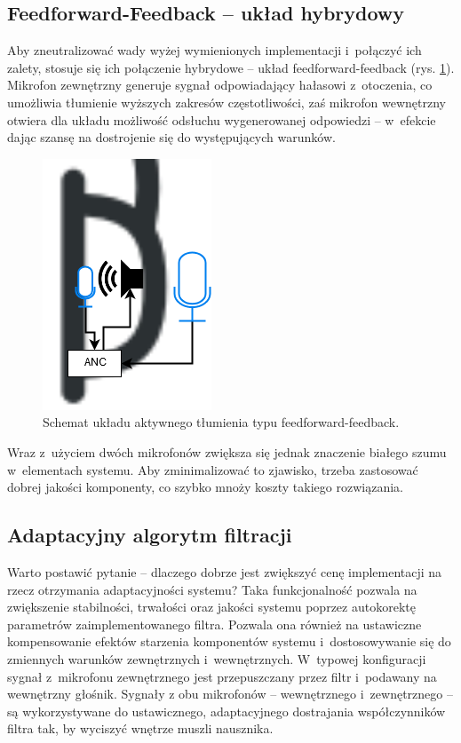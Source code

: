 \subsection{Feedforward-Feedback -- układ hybrydowy}
\label{hybrid}
Aby zneutralizować wady wyżej wymienionych implementacji i~połączyć ich zalety, stosuje się ich połączenie hybrydowe -- układ feedforward-feedback (rys. \ref{fig:feedforward_feedback}). Mikrofon zewnętrzny generuje sygnał odpowiadający hałasowi z~otoczenia, co umożliwia tłumienie wyższych zakresów częstotliwości, zaś mikrofon wewnętrzny otwiera dla układu możliwość odsłuchu wygenerowanej odpowiedzi -- w~efekcie dając szansę na dostrojenie się do występujących warunków. 
\begin{figure}[h!]
	\centering
	\includegraphics[scale=0.7]{../Assets/feedforward_feedback.png}
	\caption{Schemat układu aktywnego tłumienia typu feedforward-feedback.}
	\label{fig:feedforward_feedback}
\end{figure}

Wraz z~użyciem dwóch mikrofonów zwiększa się jednak znaczenie białego szumu w~elementach systemu. Aby zminimalizować to zjawisko, trzeba zastosować dobrej jakości komponenty, co szybko mnoży koszty takiego rozwiązania.
\subsection{Adaptacyjny algorytm filtracji}
\label{FIRLMS}
Warto postawić pytanie -- dlaczego dobrze jest zwiększyć cenę implementacji na rzecz otrzymania adaptacyjności systemu? Taka funkcjonalność pozwala na zwiększenie stabilności, trwałości oraz jakości systemu poprzez autokorektę parametrów zaimplementowanego filtra. Pozwala ona również na ustawiczne kompensowanie efektów starzenia komponentów systemu i~dostosowywanie się do zmiennych warunków zewnętrznych i~wewnętrznych. W~typowej konfiguracji sygnał z~mikrofonu zewnętrznego jest przepuszczany przez filtr i~podawany na wewnętrzny głośnik. Sygnały z obu mikrofonów -- wewnętrznego i~zewnętrznego -- są wykorzystywane do ustawicznego, adaptacyjnego dostrajania współczynników filtra tak, by wyciszyć wnętrze muszli nausznika. 

